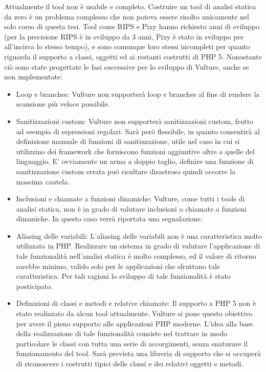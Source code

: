 Attualmente il tool non è usabile e completo. Costruire un tool di analisi statica da zero è un problema complesso che non poteva essere risolto unicamente nel solo corso di questa tesi. Tool come RIPS e Pixy hanno richiesto anni di sviluppo (per la precisione RIPS è in sviluppo da 3 anni, Pixy è stato in sviluppo per all'incirca lo stesso tempo), e sono comunque loro stessi incompleti per quanto riguarda il supporto a classi, oggetti ed ai restanti costrutti di PHP 5.
Nonostante ciò sono state progettate le fasi successive per lo sviluppo di Vulture, anche se non implementate:

\begin{itemize}
\item Loop e branches: Vulture non supporterà loop e branches al fine di rendere la scansione più veloce possibile.
\item Sanitizzazioni custom: Vulture non supporterà sanitizzazioni custom, frutto ad esempio di espressioni regolari. Sarà però flessibile, in quanto consentirà al definizione manuale di funzioni di sanitizzazione, utile nel caso in cui si utilizzino dei framework che forniscono funzioni aggiuntive oltre a quelle del linguaggio. E' ovviamente un arma a doppio taglio, definire una funzione di sanitizzazione custom errata può risultare disastroso quindi occorre la massima cautela.
\item Inclusioni e chiamate a funzioni dinamiche: Vulture, come tutti i tools di analisi statica, non è in grado di valutare inclusioni o chiamate a funzioni dinamiche. In questo caso verrà riportata una segnalazione.
\item Aliasing delle variabili: L'aliasing delle variabili non è una caratteristica molto utilizzata in PHP. Realizzare un sistema in grado di valutare l'applicazione di tale funzionalità nell'analisi statica è molto complesso, ed il valore di ritorno sarebbe minimo, valido solo per le applicazioni che sfruttano tale caratteristica. Per tali ragioni lo sviluppo di tale funzionalità è stato posticipato.
\item Definizioni di classi e metodi e relative chiamate: Il supporto a PHP 5 non è stato realizzato da alcun tool attualmente. Vulture si pone questo obiettivo per avere il pieno supporto alle applicazioni PHP moderne. L'idea alla base della realizzazione di tale funzionalità consiste nel trattare in modo particolare le classi con tutta una serie di accorgimenti, senza snaturare il funzionamento del tool. Sarà prevista una libreria di supporto che si occuperà di riconoscere i costrutti tipici delle classi e dei relativi oggetti e metodi.
\end{itemize}

